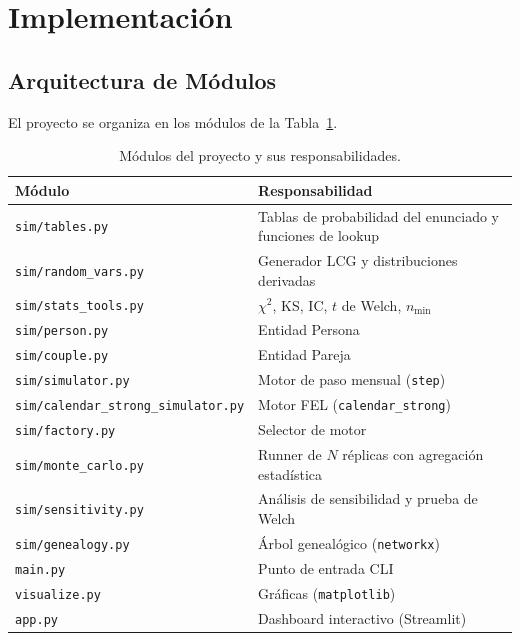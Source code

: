 \documentclass{llncs}
\begin{document}
\section{Implementación}
\label{sec:implementacion}

\subsection{Arquitectura de Módulos}

El proyecto se organiza en los módulos de la Tabla~\ref{tab:modules}.

\begin{table}[H]
\caption{Módulos del proyecto y sus responsabilidades.}
\label{tab:modules}
\centering
\begin{tabular}{ll}
\toprule
\textbf{Módulo} & \textbf{Responsabilidad} \\
\midrule
\texttt{sim/tables.py}      & Tablas de probabilidad del enunciado y funciones de lookup \\
\texttt{sim/random\_vars.py} & Generador LCG y distribuciones derivadas \\
\texttt{sim/stats\_tools.py} & $\chi^2$, KS, IC, $t$ de Welch, $n_{\min}$ \\
\texttt{sim/person.py}      & Entidad Persona \\
\texttt{sim/couple.py}      & Entidad Pareja \\
\texttt{sim/simulator.py}   & Motor de paso mensual (\texttt{step}) \\
\texttt{sim/calendar\_strong\_simulator.py} & Motor FEL (\texttt{calendar\_strong}) \\
\texttt{sim/factory.py}     & Selector de motor \\
\texttt{sim/monte\_carlo.py} & Runner de $N$ réplicas con agregación estadística \\
\texttt{sim/sensitivity.py} & Análisis de sensibilidad y prueba de Welch \\
\texttt{sim/genealogy.py}   & Árbol genealógico (\texttt{networkx}) \\
\texttt{main.py}            & Punto de entrada CLI \\
\texttt{visualize.py}       & Gráficas (\texttt{matplotlib}) \\
\texttt{app.py}             & Dashboard interactivo (Streamlit) \\
\bottomrule
\end{tabular}
\end{table}
\end{document}
